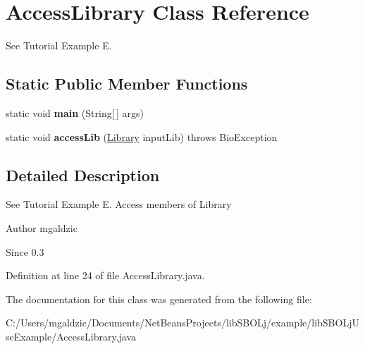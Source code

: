 \hypertarget{classlib_s_b_o_lj_use_example_1_1_access_library}{
\section{AccessLibrary Class Reference}
\label{classlib_s_b_o_lj_use_example_1_1_access_library}
}


See Tutorial Example E.  


\subsection*{Static Public Member Functions}
\begin{DoxyCompactItemize}
\item 
\hypertarget{classlib_s_b_o_lj_use_example_1_1_access_library_a8b260eecbaabcef8473fd87ada040682}{
static void {\bfseries main} (String\mbox{[}$\,$\mbox{]} args)}
\label{classlib_s_b_o_lj_use_example_1_1_access_library_a8b260eecbaabcef8473fd87ada040682}

\item 
\hypertarget{classlib_s_b_o_lj_use_example_1_1_access_library_ac5e2e74e03f0f72df3578246adf204fe}{
static void {\bfseries accessLib} (\hyperlink{classorg_1_1sbolstandard_1_1lib_s_b_o_lj_1_1_library}{Library} inputLib)  throws BioException }
\label{classlib_s_b_o_lj_use_example_1_1_access_library_ac5e2e74e03f0f72df3578246adf204fe}

\end{DoxyCompactItemize}


\subsection{Detailed Description}
See Tutorial Example E. Access members of Library \begin{DoxyAuthor}{Author}
mgaldzic 
\end{DoxyAuthor}
\begin{DoxySince}{Since}
0.3 
\end{DoxySince}


Definition at line 24 of file AccessLibrary.java.



The documentation for this class was generated from the following file:\begin{DoxyCompactItemize}
\item 
C:/Users/mgaldzic/Documents/NetBeansProjects/libSBOLj/example/libSBOLjUseExample/AccessLibrary.java\end{DoxyCompactItemize}
